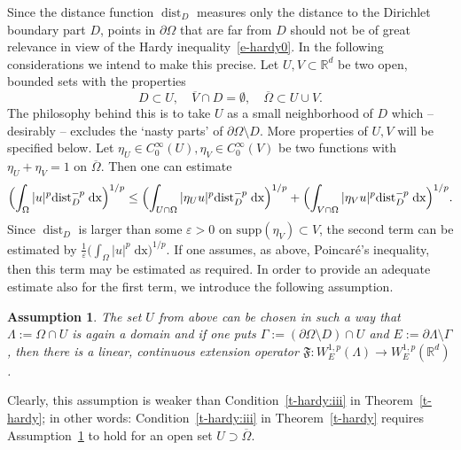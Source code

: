 \documentclass[10pt,leqno]{amsart}
\newtheorem{assumption}[theorem]{Assumption}
\theoremstyle{definition}
\numberwithin{equation}{section}
\begin{document}
Since the distance function ${\operatorname{dist}}_D$ measures only the distance to the
Dirichlet boundary part $D$, points in $\partial \Omega$ that are far from $D$
should not be of great relevance in view of the Hardy
inequality~\eqref{e-hardy0}. In the following considerations we intend to make
this precise. Let $U,V \subset {{\mathbb R}}^d$ be two open, bounded sets with the
properties 
\begin{equation} \label{e-propUV}
 D \subset U, \quad \overline V \cap D = \emptyset, \quad \overline \Omega
	\subset U \cup V.
\end{equation}
The philosophy behind this is to take $U$ as a small neighborhood of $D$ which
-- desirably -- excludes the `nasty parts' of $\partial \Omega \setminus D$.
More properties of $U,V$ will be specified below. Let $\eta_U \in
C^\infty_0(U), \eta_V \in C^\infty_0(V)$ be two functions with $\eta_U + \eta_V
= 1$ on $\overline \Omega$. Then one can estimate
\[ \Bigl( \int_\Omega |u|^p {\operatorname{dist}}_D^{-p} \; \mathrm{d} {{\mathrm x}} \Bigr)^{1/p}
	\le \Bigl( \int_{U \cap \Omega} |\eta_U u|^p {\operatorname{dist}}_D^{-p}
	\; \mathrm{d} {{\mathrm x}} \Bigr)^{1/p} + \Bigl( \int_{V \cap \Omega}
	|\eta_V u|^p {\operatorname{dist}}_D^{-p} \; \mathrm{d} {{\mathrm x}} \Bigr)^{1/p}.
\]
Since ${\operatorname{dist}}_D$ is larger than some ${\varepsilon} > 0$ on $\mathrm{supp}(\eta_V)
\subset V$, the second term can be estimated by $\frac{1}{\varepsilon} \bigl(
\int_{\Omega} |u|^p \; \mathrm{d} {{\mathrm x}} \bigr)^{1/p}$. If one assumes, as
above, Poincar\'e's inequality, then this term may be estimated as required. In
order to provide an adequate estimate also for the first term, we introduce the
following assumption.

\begin{assumption} \label{a-1}
 The set $U$ from above can be chosen in such a way that $\Lambda := \Omega
 \cap U$ is again a domain and if one puts $\Gamma := (\partial \Omega
 \setminus D) \cap U$ and $E := \partial \Lambda \setminus \Gamma$, then there
 is a linear, continuous extension operator $\mathfrak F : W^{1,p}_E(\Lambda)
 \to W^{1,p}_E({{\mathbb R}}^d)$.
\end{assumption}
Clearly, this assumption is weaker than Condition~\ref{t-hardy:iii} in
Theorem~\ref{t-hardy}; in other words: Condition~\ref{t-hardy:iii} in
Theorem~\ref{t-hardy} requires Assumption~\ref{a-1} to hold for an open set $U
\supset \overline \Omega$.
\end{document}
